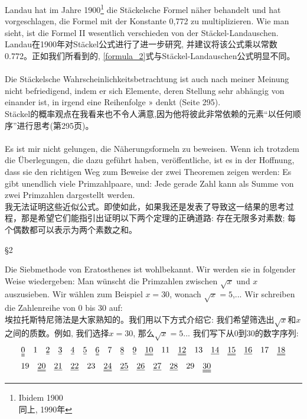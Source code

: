 \documentclass[UTF8,a4paper,zihao=-4]{article}
\renewcommand\underline{\bgroup\markoverwith
   {%
     \rule[-0.5ex]{2pt}{0.4pt}%
   }%
   \ULon}
\newcommand\doubleunderline{\bgroup\markoverwith
   {%
     \rule[-0.5ex]{2pt}{0.4pt}%
     \llap{{\rule[-0.8ex]{2pt}{0.4pt}}}%
   }%
   \ULon}
\newcommand\tripleunderline{\bgroup\markoverwith
   {%
     \rule[-0.5ex]{2pt}{0.4pt}%
     \llap{{\rule[-0.8ex]{2pt}{0.4pt}}}%
     \llap{{\rule[-1.1ex]{2pt}{0.4pt}}}%
   }%
   \ULon}
\begin{document}
\indent Landau hat im Jahre 1900\footnote[2]{Ibidem 1900\\\indent 同上, 1990年} die Stäckelsche Formel näher behandelt und hat vorgeschlagen, die Formel mit der Konstante 0,772 zu multiplizieren. Wie man sieht, ist die Formel II wesentlich verschieden von der Stäckel-Landauschen.\\
\indent Landau在1900年\footnotemark[2]对Stäckel公式进行了进一步研究, 并建议将该公式乘以常数0.772。正如我们所看到的, \ref{formula_2}式与Stäckel-Landauschen公式明显不同。\\\\
\indent Die Stäckelsche Wahrscheinlichkeitsbetrachtung ist auch nach meiner Meinung nicht befriedigend, indem er sich Elemente, deren Stellung sehr abhängig von einander ist, in irgend eine Reihenfolge » denkt (Seite 295).\\
\indent Stäckel的概率观点在我看来也不令人满意,因为他将彼此非常依赖的元素“以任何顺序”进行思考(第295页)。\\\\
\indent Es ist mir nicht gelungen, die Näherungsformeln zu beweisen. Wenn ich trotzdem die Überlegungen, die dazu geführt haben, veröffentliche, ist es in der Hoffnung, dass sie den richtigen Weg zum Beweise der zwei Theoremen zeigen werden: Es gibt unendlich viele Primzahlpaare, und: Jede gerade Zahl kann als Summe von zwei Primzahlen dargestellt werden.\\
\indent 我无法证明这些近似公式。即使如此，如果我还是发表了导致这一结果的思考过程，那是希望它们能指引出证明以下两个定理的正确道路: 存在无限多对素数; 每个偶数都可以表示为两个素数之和。
\vspace{2em}
\begin{center}§2\end{center}
\indent\indent Die Siebmethode von Eratosthenes ist wohlbekannt. Wir werden sie in folgender Weise wiedergeben: Man wünscht die Primzahlen zwischen $\sqrt{x}$ und $x$ auszusieben. Wir wählen zum Beispiel $x=30$, wonach $\sqrt{x}=5$,... Wir schreiben die Zahlenreihe von $0$ bis $30$ auf:\\
\indent 埃拉托斯特尼筛法是大家熟知的。我们用以下方式介绍它: 我们希望筛选出$\sqrt{x}$和$x$之间的质数。例如, 我们选择$x=30$, 那么$\sqrt{x}=5...$ 我们写下从$0$到$30$的数字序列:
\begin{align*}
&\tripleunderline0\quad1\quad\underline2\quad\underline3\quad\underline4\quad\underline5\quad\doubleunderline6\quad7\quad\underline8\quad\underline9\quad\doubleunderline{10}\quad11\quad\doubleunderline{12}\quad13\quad\underline{14}\quad\doubleunderline{15}\quad\underline{16}\quad17\quad\doubleunderline{18}\\
&19\quad\doubleunderline{20}\quad\underline{21}\quad\underline{22}\quad23\quad\doubleunderline{24}\quad\underline{25}\quad\underline{26}\quad\underline{27}\quad\underline{28}\quad29\quad\tripleunderline{30}
\end{align*}
\end{document}
